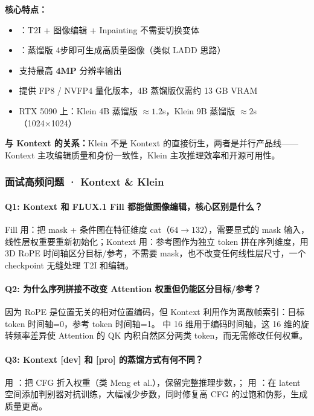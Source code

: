 \textbf{核心特点：}
\begin{itemize}[leftmargin=1.5em]
  \item {}：T2I + 图像编辑 + Inpainting 不需要切换变体
  \item {}：蒸馏版 4步即可生成高质量图像（类似 LADD 思路）
  \item 支持最高 \textbf{4MP} 分辨率输出
  \item 提供 FP8 / NVFP4 量化版本，4B 蒸馏版仅需约 13 GB VRAM
  \item RTX 5090 上：Klein 4B 蒸馏版 $\approx 1.2$s，Klein 9B 蒸馏版 $\approx 2$s（1024×1024）
\end{itemize}

\textbf{与 Kontext 的关系：}Klein 不是 Kontext 的直接衍生，两者是并行产品线——Kontext 主攻编辑质量和身份一致性，Klein 主攻推理效率和开源可用性。

\subsubsection{面试高频问题 · Kontext \& Klein}

\paragraph{Q1: Kontext 和 FLUX.1 Fill 都能做图像编辑，核心区别是什么？}
Fill 用：把 mask + 条件图在特征维度 cat（$64 \to 132$），需要显式的 mask 输入， 线性层权重要重新初始化；Kontext 用：参考图作为独立 token 拼在序列维度，用 3D RoPE 时间轴区分目标/参考，不需要 mask，也不改变任何线性层尺寸，一个 checkpoint 无缝处理 T2I 和编辑。

\paragraph{Q2: 为什么序列拼接不改变 Attention 权重但仍能区分目标/参考？}
因为 RoPE 是位置无关的相对位置编码，但 Kontext 利用作为离散帧索引：目标 token 时间轴=0，参考 token 时间轴=1。 中 16 维用于编码时间轴，这 16 维的旋转频率差异使 Attention 的 QK 内积自然区分两类 token，而无需修改任何权重。

\paragraph{Q3: Kontext [dev] 和 [pro] 的蒸馏方式有何不同？}
\code{[dev]} 用 ：把 CFG 折入权重（类 Meng et al.），保留完整推理步数，；\code{[pro]} 用 ：在 latent 空间添加判别器对抗训练，大幅减少步数，同时修复高 CFG 的过饱和伪影，生成质量更高。

